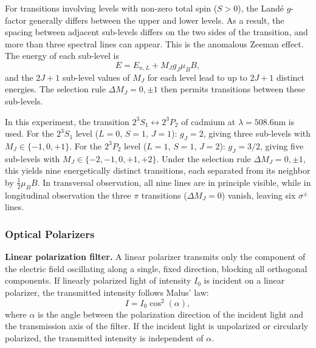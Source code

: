 \documentclass{article}
\begin{document}
For transitions involving levels with non-zero total spin ($S > 0$), the Landé $g$-factor generally differs between the upper and lower levels. As a result, the spacing between adjacent sub-levels differs on the two sides of the transition, and more than three spectral lines can appear. This is the anomalous Zeeman effect. The energy of each sub-level is
\begin{equation}
    E = E_{n,L} + M_J g_J \mu_B B,
\end{equation}
and the $2J+1$ sub-level values of $M_J$ for each level lead to up to $2J+1$ distinct energies. The selection rule $\Delta M_J = 0, \pm 1$ then permits transitions between these sub-levels.

In this experiment, the transition $2^3S_1 \leftrightarrow 2^3P_2$ of cadmium at $\lambda = 508.6$nm is used. For the $2^3S_1$ level ($L=0$, $S=1$, $J=1$): $g_J = 2$, giving three sub-levels with $M_J \in \{-1, 0, +1\}$. For the $2^3P_2$ level ($L=1$, $S=1$, $J=2$): $g_J = 3/2$, giving five sub-levels with $M_J \in \{-2, -1, 0, +1, +2\}$. Under the selection rule $\Delta M_J = 0, \pm 1$, this yields nine energetically distinct transitions, each separated from its neighbor by $\frac{1}{2}\mu_B B$. In transversal observation, all nine lines are in principle visible, while in longitudinal observation the three $\pi$ transitions ($\Delta M_J = 0$) vanish, leaving six $\sigma^\pm$ lines.

\subsubsection{Optical Polarizers}

\textbf{Linear polarization filter.} A linear polarizer transmits only the component of the electric field oscillating along a single, fixed direction, blocking all orthogonal components. If linearly polarized light of intensity $I_0$ is incident on a linear polarizer, the transmitted intensity follows Malus' law:
\begin{equation}
    I = I_0\cos^2(\alpha),
\end{equation}
where $\alpha$ is the angle between the polarization direction of the incident light and the transmission axis of the filter. If the incident light is unpolarized or circularly polarized, the transmitted intensity is independent of $\alpha$.
\end{document}
